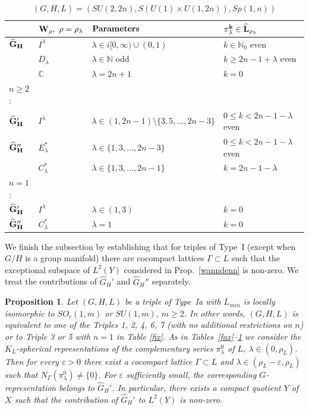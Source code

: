 \documentclass[10]{amsart}
\newtheorem{pro}[thm]{Proposition}
\theoremstyle{remark}
\theoremstyle{definition}
\numberwithin{equation}{section}
\newcommand{\C}{\mathbb{C}}           %
\newcommand{\N}{\mathbb{N}}           %
\newcommand{\ve}{\varepsilon}
\begin{document}
{\begin{table}[h]
\caption{$(G,H,L)=(SU(2,2n),S(U(1)\times U(1,2n)), Sp(1,n))$}\label{tauto}
\begin{center}
\renewcommand{\arraystretch}{1.3}
\begin{tabular}{|l||l||l||l|}
  \hline
  &${\bf W_\rho,\ \rho=\rho_\lambda}$ & ${\bf Parameters}$ & ${\bf \pi^k_\lambda\in\widehat L_{\rho_\lambda}}$\\
  \hline
    \hline
  ${\bf \widehat G_H}$& $I^{\lambda}$ & $\lambda\in i[0,\infty)\cup (0,1)$ & $k\in\N_0$ even  \\
\hline
&$D_\lambda$ &$\lambda\in\N$ odd&$ k\ge2n-1+\lambda$ even \\
\hline
&$\C$ &$\lambda=2n+1$ & $ k=0$\\
   \hline
$n\ge 2$:\\
    \hline
${\bf \widehat G_H'}$&$I^{\lambda}$& $\lambda\in (1,2n-1)\setminus\{3,5,\dots,2n-3\}$ & $ 0\le k<2n-1-\lambda$ even \\
 \hline
    \hline
${\bf \widehat G_H''}$&$E_{\lambda}^*$&$\lambda\in\{1,3,\dots,2n-3\}$&$ 0\le k<2n-1-\lambda$ even \\
\hline
&$C_\lambda^*$&$\lambda\in\{1,3,\dots,2n-1\}$&$k=2n-1-\lambda$\\
\hline
$n=1$:\\
    \hline
${\bf \widehat G_H'}$&$I^{\lambda}$& $\lambda\in (1,3)$ & $k=0$ \\
 \hline
    \hline
${\bf \widehat G_H''}$&$C_\lambda^*$&$\lambda=1  $&$k=0$\\
\hline
\end{tabular}
\end{center}
\end{table}

\newpage

We finish 
the subsection by establishing that for triples of Type~I (except when $G/H$ is a group manifold) there are cocompact lattices $\Gamma\subset L$ such that the exceptional 
subspace of $L^2(Y)$ considered in Prop.~\ref{wanndenn} is non-zero. We treat the contributions of $\widehat G_H'$ and  $\widehat G_H''$ separately.

\begin{pro}\label{nanu}
Let $(G,H,L)$ be a triple of Type~Ia with $L_{min}$ is locally isomorphic to $SO_e(1,m)$ or $SU(1,m)$, $m\ge 2$. In other words, $(G,H,L)$ is equivalent to one of the Triples 1, 2, 4, 6, 7 (with no additional restrictions on $n$) or to Triple 3 or 5 with $n=1$ in Table \ref{fix}. As in Tables~\ref{fax}--\ref{tauto} we consider the $K_L$-spherical
representations of the complementary series $\pi^0_\lambda$ of $L$, $\lambda\in (0,\rho_L)$. 
Then for every $\ve>0$ there exist a cocompact  lattice $\Gamma\subset L$ and $\lambda\in (\rho_L-\ve,\rho_L)$ such that
$N_\Gamma(\pi_\lambda^0)\ne\{0\}$. For $\ve$ sufficiently small, the corresponding $G$-representation belongs to $\widehat G_H'$. In particular, there exists a compact quotient $Y$ of $X$ such that the  contribution of $\widehat G_H'$ to $L^2(Y)$ is non-zero.
\end{pro}

}
\end{document}
